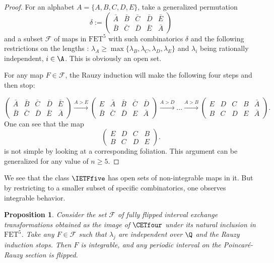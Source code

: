 \documentclass[12pt]{article}
\newtheorem{proposition}{Proposition}
\theoremstyle{definition}
\begin{document}
\begin{proof}
For an alphabet $A=\{A,B,C,D,E\}$, take a generalized permutation
$$
\delta:=\begin{pmatrix} \bar{A} &\bar{B} & \bar{C} & \bar{D} & \bar{E} \\
\bar{B} &\bar{C} & \bar{D} & \bar{E} & \bar{A}
\end{pmatrix}
$$
and a subset $\mathcal{F}$ of maps in $\mathrm{FET}^5$ with such combinatorics $\delta$ and the following restrictions on the lengths : $\lambda_A \geq \max \{\lambda_B, \lambda_C, \lambda_D, \lambda_E\}$ and $\lambda_i$ being rationally independent, $i \in \A$. This is obviously an open set.

For any map $F \in \mathcal{F}$, the Rauzy induction will make the following four steps and then stop:

\begin{equation*}
\begin{pmatrix} \bar{A} &\bar{B} & \bar{C} & \bar{D} & \bar{E} \\
\bar{B} &\bar{C} & \bar{D} & \bar{E} & \bar{A}
\end{pmatrix}
\xrightarrow[]{A>E} 
\begin{pmatrix} E & \bar{A} &\bar{B} & \bar{C} & \bar{D}  \\
\bar{B} &\bar{C} & \bar{D} & {E} & \bar{A}
\end{pmatrix}
\xrightarrow[]{A>D}
\ldots 
\xrightarrow[]{A>B}
\begin{pmatrix} E & D &C & B & \bar{A}  \\
{B} &{C} & {D} & {E} & \bar{A}
\end{pmatrix}.
\end{equation*}
One can see that the map 
\begin{equation}\label{eq:not_simple_IET}
\begin{pmatrix} E & D &C & B  \\
{B} &{C} & {D} & {E} 
\end{pmatrix}.
\end{equation}
is not simple by looking at a corresponding foliation. This argument can be generalized for any value of $n \geq 5$. 
\end{proof}

We see that the class $\IETFfive$ has open sets of non-integrable maps in it. But by restricting to a smaller subset of specific combinatorics, one observes integrable behavior.

\begin{proposition}\label{thm:CETfour}
Consider the set $\mathcal{F}$ of fully flipped interval exchange transformations obtained as the image of $\CETfour$ under its natural inclusion in $\mathrm{FET}^5$. 
Take any $F \in \mathcal{F}$ such that ${\lambda}_j$ are independent over $\Q$ and the Rauzy induction stops. Then $F$ is integrable, and any periodic interval on the Poincaré-Rauzy section is flipped.
\end{proposition}
\end{document}
